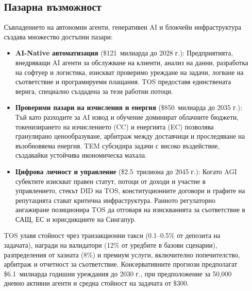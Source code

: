\documentclass[11pt]{article}
\begin{document}
\subsection{Пазарна възможност}
Съвпадението на автономни агенти, генеративен AI и блокчейн инфраструктура създава множество достъпни пазари:
\begin{itemize}[noitemsep]
  \item \textbf{AI-Native автоматизация} (\$121~милиарда до 2028 г.): Предприятията, внедряващи AI агенти за обслужване на клиенти, анализ на данни, разработка на софтуер и логистика, изискват проверимо уреждане на задачи, логване на съответствие и програмируеми плащания. TOS предоставя единствената верига, специално създадена за тези работни потоци.
  \item \textbf{Проверими пазари на изчисления и енергия} (\$850~милиарда до 2035 г.): Тъй като разходите за AI извод и обучение доминират облачните бюджети, токенизирането на изчислението (CC) и енергията (EC) позволява гранулирано ценообразуване, арбитраж между доставчици и проследяване на възобновяема енергия. TEM субсидира задачи с високо въздействие, създавайки устойчива икономическа махала.
  \item \textbf{Цифрова личност и управление} (\$2.5~трилиона до 2045 г.): Когато AGI субектите изискват правен статут, потоци от доходи и участие в управлението, стекът DID на TOS, конституционните договори и графите на репутацията стават критична инфраструктура. Ранното регулаторно ангажиране позиционира TOS да отговаря на изискванията за съответствие в САЩ, ЕС и юрисдикциите на Сингапур.
\end{itemize}

TOS улавя стойност чрез транзакционни такси (0.1--0.5\% от депозита на задачата), награди на валидатори (12\% от уредбите в базови сценарии), разпределения от хазната (8\%) и премиум услуги, включително попечителство, арбитраж и отчетност за съответствие. Консервативните прогнози предполагат \$6.1~милиарда годишни уреждания до 2030 г., при предположение за 50,000 дневно активни агенти и средна стойност на задачата от \$300.
\end{document}
